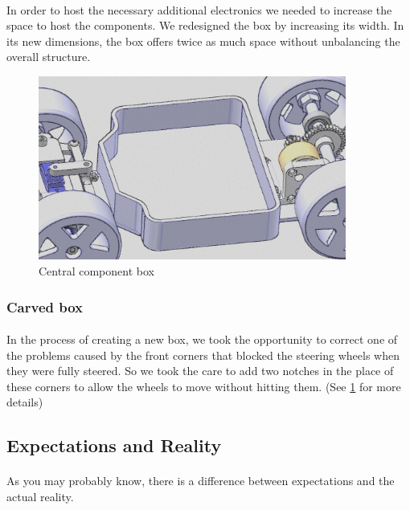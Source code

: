 \paragraph{}
In order to host the necessary additional electronics we needed to increase the
space to host the components. We redesigned the box by increasing its width.
In its new dimensions, the box offers twice as much space without unbalancing
the overall structure.

\begin{figure}[!ht]
    \begin{center}
        \includegraphics[width=0.9\textwidth]{Images/kart_central_box.png}
    \end{center}
    \caption{Central component box}
    \label{fig:central_box}
\end{figure}

\subsubsection{Carved box}
\paragraph{}

In the process of creating a new box, we took the opportunity to correct one
of the problems caused by the front corners that blocked the steering wheels
when they were fully steered. So we took the care to add two notches in
the place of these corners to allow the wheels to move without hitting them.
(See \ref{fig:central_box} for more details)

\subsection{Expectations and Reality}
\paragraph{}
As you may probably know, there is a difference between expectations and the
actual reality.

